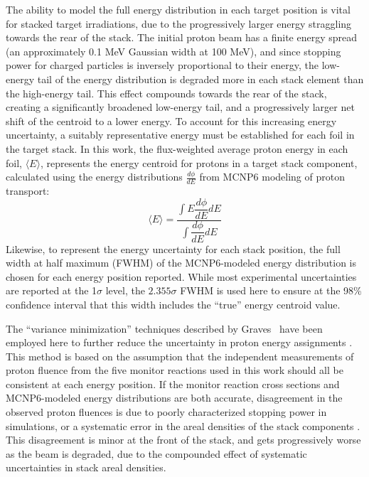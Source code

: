 The ability to model the full energy distribution in each target position is vital for stacked target irradiations, due to the progressively larger energy straggling towards the rear of the stack.
The initial proton beam has a finite energy spread (an approximately 0.1 MeV Gaussian width at 100 MeV), and since stopping power for charged particles is inversely proportional to their energy, the low-energy tail of the energy distribution is degraded more in each stack element than the high-energy tail.
This effect compounds  towards the rear of the stack, creating a significantly broadened low-energy tail, and a progressively larger net shift of the centroid to a lower energy. 
To account for this increasing energy uncertainty, a suitably representative energy must be established for  each foil in the target stack.
In this work, the flux-weighted average proton  energy in each foil, $\langle E \rangle$,  represents the energy centroid for protons in a target stack component, calculated using the energy distributions $\frac{d\phi}{dE}$ from MCNP6 modeling of proton transport:
\begin{equation}
\langle E \rangle = \dfrac{{\displaystyle\int E \dfrac{d\phi}{dE} dE}}{{\displaystyle\int \dfrac{d\phi}{dE} dE}}
\end{equation}
Likewise, to represent the energy uncertainty for each stack position, the full width at half maximum (FWHM) of the MCNP6-modeled energy distribution is chosen for each energy position reported.
While most experimental uncertainties are reported at the 1$\sigma$ level, the $2.355\sigma$ FWHM is used here to ensure at the 98\% confidence interval that this width includes  the \enquote{true} energy centroid value.





The \enquote{variance minimization} techniques  described by  Graves \etal\  have been employed here to further reduce the uncertainty in proton energy assignments     \cite{Graves2016}.
This method is based on the assumption that the independent measurements of proton fluence from the five monitor reactions used in this work should all be consistent at each energy position.
If the monitor reaction cross sections and MCNP6-modeled energy distributions are both accurate, disagreement in the  observed proton fluences is due to poorly characterized stopping power in simulations, or a systematic error in the 
areal densities of the stack components \cite{Graves2016,Marus2015}. 
This disagreement is minor at the front of the stack, and gets progressively worse as the beam is degraded, due to the compounded effect of systematic uncertainties in stack areal densities.



